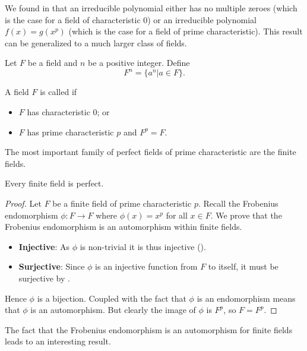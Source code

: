 We found in  that an irreducible polynomial either has no multiple zeroes (which is the case for a field of characteristic 0) or an irreducible polynomial $f(x) = g(x^p)$ (which is the case for a field of prime characteristic). This result can be generalized to a much larger class of fields.

\begin{definition}
    Let $F$ be a field and $n$ be a positive integer. Define
    \[
        F^n = \{a^n \vert a \in F\}.
    \]
\end{definition}

\begin{definition}
    A field $F$ is called  if
    \begin{itemize}
        \item $F$ has characteristic 0; or
        \item $F$ has prime characteristic $p$ and $F^p = F$.
    \end{itemize}
\end{definition}

The most important family of perfect fields of prime characteristic are the finite fields.

\begin{theorem}\label{thrm-finite-field-is-perfect}
    Every finite field is perfect.
\end{theorem}
\begin{proof}
    Let $F$ be a finite field of prime characteristic $p$. Recall the Frobenius endomorphism $\phi: F \to F$ where $\phi(x) = x^p$ for all $x \in F$. We prove that the Frobenius endomorphism is an automorphism within finite fields.
    \begin{itemize}
        \item \textbf{Injective}: As $\phi$ is non-trivial it is thus injective ().
        \item \textbf{Surjective}: Since $\phi$ is an injective function from $F$ to itself, it must be surjective by .
    \end{itemize}
    Hence $\phi$ is a bijection. Coupled with the fact that $\phi$ is an endomorphism means that $\phi$ is an automorphism. But clearly the image of $\phi$ is $F^p$, so $F = F^p$.
\end{proof}

The fact that the Frobenius endomorphism is an automorphism for finite fields leads to an interesting result.

